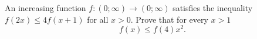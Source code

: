\problem
An increasing function $f \colon (0; \infty) \to (0; \infty)$ satisfies the
inequality $f (2 x) \leq 4 f (x + 1)$ for all $x > 0$.
Prove that for every $x > 1$
\[
    f(x) \leq f(4) x^2
.\]
\solution
\endproblem
